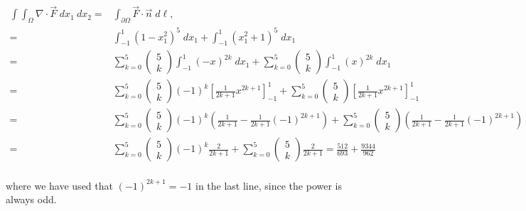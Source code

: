 \documentclass[11pt]{article}
\begin{document}
\begin{solution}
\begin{align*}
\int \int_{\Omega} \nabla \cdot \vec{F} \;d x_1 \:d x_2 =&\int_{\partial \Omega}\vec{F}\cdot\vec{n} \;d\ell,\\
=&\int_{-1}^1 (1-x_1^ 2)^ 5 \;dx_1 + \int_{-1}^1 (x_1^2 + 1)^ 5 \;dx_1\\
=&\sum_{k = 0}^5 \left(\begin{array}{l}
5 \\
k
\end{array}\right)\int_{-1}^1 (-x)^{2k} \;dx_1 + \sum_{k = 0}^5 \left(\begin{array}{l}
5 \\
k
\end{array}\right)\int_{-1}^1 (x)^{2k} \;dx_1\\
=& \sum_{k = 0}^5 \left(\begin{array}{l}
5 \\
k
\end{array}\right)(-1)^k\left[\frac{1}{2k+1}x^{2k+1}\right]_{-1}^1 + \sum_{k = 0}^5 \left(\begin{array}{l}
5 \\
k
\end{array}\right)\left[\frac{1}{2k+1}x^{2k+1}\right]_{-1}^1\\
=& \sum_{k = 0}^5 \left(\begin{array}{l}
5 \\
k
\end{array}\right)(-1)^k\left(\frac{1}{2k+1} - \frac{1}{2k+1}(-1)^{2k+1}\right) + \sum_{k = 0}^5 \left(\begin{array}{l}
5 \\
k
\end{array}\right)\left(\frac{1}{2k+1} - \frac{1}{2k+1}(-1)^{2k+1}\right)\\
=& \sum_{k = 0}^5 \left(\begin{array}{l}
5 \\
k
\end{array}\right)(-1)^k\frac{2}{2k+1} + \sum_{k = 0}^5 \left(\begin{array}{l}
5 \\
k
\end{array}\right)\frac{2}{2k+1} = \frac{512}{693} + \frac{9344}{962}\\
\end{align*}

where we have used that $(-1)^{2k+1} = -1$ in the last line, since the power is always odd. 

\end{solution}
\end{document}
